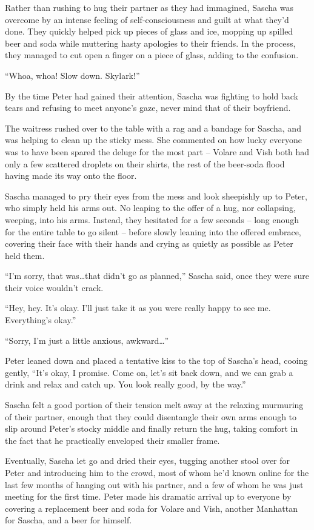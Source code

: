 Rather than rushing to hug their partner as they had immagined, Sascha was overcome by an intense feeling of self-consciousness and guilt at what they'd done. They quickly helped pick up pieces of glass and ice, mopping up spilled beer and soda while muttering hasty apologies to their friends. In the process, they managed to cut open a finger on a piece of glass, adding to the confusion.

``Whoa, whoa! Slow down. Skylark!''

By the time Peter had gained their attention, Sascha was fighting to hold back tears and refusing to meet anyone's gaze, never mind that of their boyfriend.

The waitress rushed over to the table with a rag and a bandage for Sascha, and was helping to clean up the sticky mess. She commented on how lucky everyone was to have been spared the deluge for the most part -- Volare and Vish both had only a few scattered droplets on their shirts, the rest of the beer-soda flood having made its way onto the floor.

Sascha managed to pry their eyes from the mess and look sheepishly up to Peter, who simply held his arms out. No leaping to the offer of a hug, nor collapsing, weeping, into his arms. Instead, they hesitated for a few seconds -- long enough for the entire table to go silent -- before slowly leaning into the offered embrace, covering their face with their hands and crying as quietly as possible as Peter held them.

``I'm sorry, that was\ldots{}that didn't go as planned,'' Sascha said, once they were sure their voice wouldn't crack.

``Hey, hey. It's okay. I'll just take it as you were really happy to see me. Everything's okay.''

``Sorry, I'm just a little anxious, awkward\ldots{}''

Peter leaned down and placed a tentative kiss to the top of Sascha's head, cooing gently, ``It's okay, I promise. Come on, let's sit back down, and we can grab a drink and relax and catch up. You look really good, by the way.''

Sascha felt a good portion of their tension melt away at the relaxing murmuring of their partner, enough that they could disentangle their own arms enough to slip around Peter's stocky middle and finally return the hug, taking comfort in the fact that he practically enveloped their smaller frame.

Eventually, Sascha let go and dried their eyes, tugging another stool over for Peter and introducing him to the crowd, most of whom he'd known online for the last few months of hanging out with his partner, and a few of whom he was just meeting for the first time. Peter made his dramatic arrival up to everyone by covering a replacement beer and soda for Volare and Vish, another Manhattan for Sascha, and a beer for himself.

